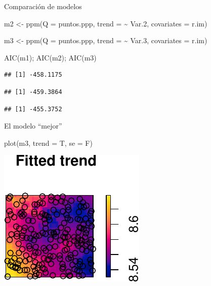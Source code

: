 \documentclass[
  11pt,
  ignorenonframetext,
]{beamer}
\newenvironment{Shaded}{}{}
\newcommand{\AttributeTok}[1]{\textcolor[rgb]{0.49,0.56,0.16}{#1}}
\newcommand{\FloatTok}[1]{\textcolor[rgb]{0.25,0.63,0.44}{#1}}
\newcommand{\FunctionTok}[1]{\textcolor[rgb]{0.02,0.16,0.49}{#1}}
\newcommand{\NormalTok}[1]{#1}
\newcommand{\OtherTok}[1]{\textcolor[rgb]{0.00,0.44,0.13}{#1}}
\newcommand{\SpecialCharTok}[1]{\textcolor[rgb]{0.25,0.44,0.63}{#1}}
\begin{document}
\begin{frame}[fragile]{Comparación de modelos}
\protect\hypertarget{comparaciuxf3n-de-modelos}{}
\begin{Shaded}
\begin{Highlighting}[]
\NormalTok{m2 }\OtherTok{\textless{}{-}} \FunctionTok{ppm}\NormalTok{(}\AttributeTok{Q =}\NormalTok{ puntos.ppp,}
          \AttributeTok{trend =} \SpecialCharTok{\textasciitilde{}}\NormalTok{ Var}\FloatTok{.2}\NormalTok{,}
          \AttributeTok{covariates =}\NormalTok{ r.im)}

\NormalTok{m3 }\OtherTok{\textless{}{-}} \FunctionTok{ppm}\NormalTok{(}\AttributeTok{Q =}\NormalTok{ puntos.ppp,}
          \AttributeTok{trend =} \SpecialCharTok{\textasciitilde{}}\NormalTok{ Var}\FloatTok{.3}\NormalTok{,}
          \AttributeTok{covariates =}\NormalTok{ r.im)}

\FunctionTok{AIC}\NormalTok{(m1); }\FunctionTok{AIC}\NormalTok{(m2); }\FunctionTok{AIC}\NormalTok{(m3)}
\end{Highlighting}
\end{Shaded}

\begin{verbatim}
## [1] -458.1175
\end{verbatim}

\begin{verbatim}
## [1] -459.3864
\end{verbatim}

\begin{verbatim}
## [1] -455.3752
\end{verbatim}
\end{frame}

\begin{frame}[fragile]{El modelo ``mejor''}
\protect\hypertarget{el-modelo-mejor}{}
\begin{Shaded}
\begin{Highlighting}[]
\FunctionTok{plot}\NormalTok{(m3, }\AttributeTok{trend =}\NormalTok{ T, }\AttributeTok{se =}\NormalTok{ F)}
\end{Highlighting}
\end{Shaded}

\begin{center}\includegraphics{Tutorial-spatstat_files/figure-beamer/unnamed-chunk-23-1} \end{center}
\end{frame}
\end{document}
